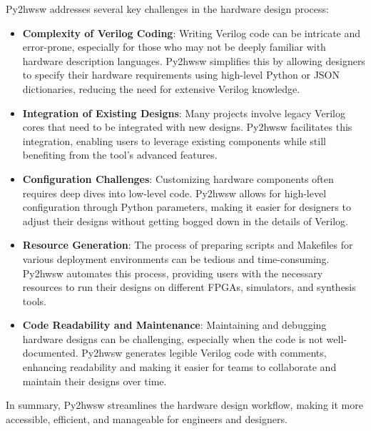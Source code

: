 %

Py2hwsw addresses several key challenges in the hardware design process:
\begin{itemize}
    \item \textbf{Complexity of Verilog Coding}: Writing Verilog code can be intricate and error-prone, especially for those who may not be deeply familiar with hardware description languages. Py2hwsw simplifies this by allowing designers to specify their hardware requirements using high-level Python or JSON dictionaries, reducing the need for extensive Verilog knowledge.

    \item \textbf{Integration of Existing Designs}: Many projects involve legacy Verilog cores that need to be integrated with new designs. Py2hwsw facilitates this integration, enabling users to leverage existing components while still benefiting from the tool's advanced features.

    \item \textbf{Configuration Challenges}: Customizing hardware components often requires deep dives into low-level code. Py2hwsw allows for high-level configuration through Python parameters, making it easier for designers to adjust their designs without getting bogged down in the details of Verilog.

    \item \textbf{Resource Generation}: The process of preparing scripts and Makefiles for various deployment environments can be tedious and time-consuming. Py2hwsw automates this process, providing users with the necessary resources to run their designs on different FPGAs, simulators, and synthesis tools.

    \item \textbf{Code Readability and Maintenance}: Maintaining and debugging hardware designs can be challenging, especially when the code is not well-documented. Py2hwsw generates legible Verilog code with comments, enhancing readability and making it easier for teams to collaborate and maintain their designs over time.
\end{itemize}
In summary, Py2hwsw streamlines the hardware design workflow, making it more accessible, efficient, and manageable for engineers and designers.
